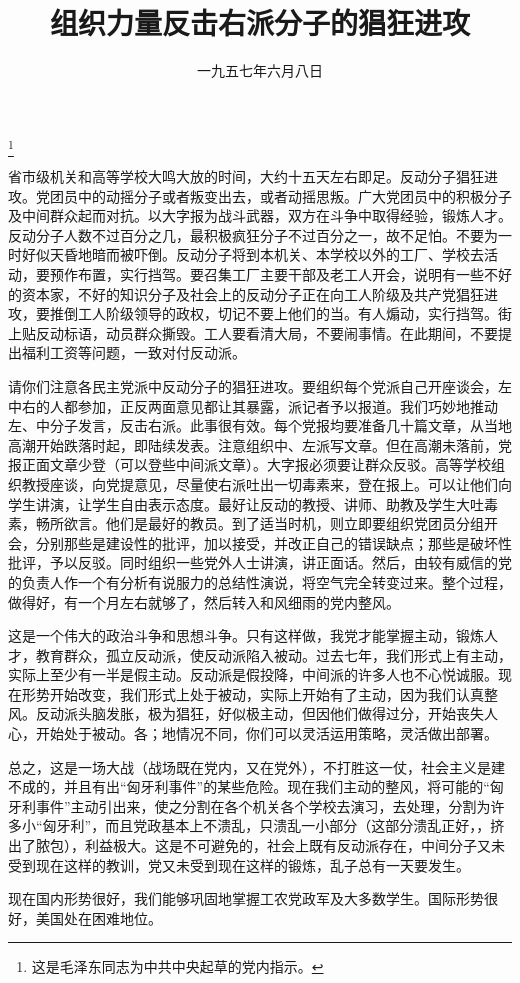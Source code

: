 
\title{组织力量反击右派分子的猖狂进攻}
\date{一九五七年六月八日}
\thanks{这是毛泽东同志为中共中央起草的党内指示。}
\maketitle


省市级机关和高等学校大鸣大放的时间，大约十五天左右即足。反动分子猖狂进攻。党团员中的动摇分子或者叛变出去，或者动摇思叛。广大党团员中的积极分子及中间群众起而对抗。以大字报为战斗武器，双方在斗争中取得经验，锻炼人才。反动分子人数不过百分之几，最积极疯狂分子不过百分之一，故不足怕。不要为一时好似天昏地暗而被吓倒。反动分子将到本机关、本学校以外的工厂、学校去活动，要预作布置，实行挡驾。要召集工厂主要干部及老工人开会，说明有一些不好的资本家，不好的知识分子及社会上的反动分子正在向工人阶级及共产党猖狂进攻，要推倒工人阶级领导的政权，切记不要上他们的当。有人煽动，实行挡驾。街上贴反动标语，动员群众撕毁。工人要看清大局，不要闹事情。在此期间，不要提出福利工资等问题，一致对付反动派。

请你们注意各民主党派中反动分子的猖狂进攻。要组织每个党派自己开座谈会，左中右的人都参加，正反两面意见都让其暴露，派记者予以报道。我们巧妙地推动左、中分子发言，反击右派。此事很有效。每个党报均要准备几十篇文章，从当地高潮开始跌落时起，即陆续发表。注意组织中、左派写文章。但在高潮未落前，党报正面文章少登（可以登些中间派文章）。大字报必须要让群众反驳。高等学校组织教授座谈，向党提意见，尽量使右派吐出一切毒素来，登在报上。可以让他们向学生讲演，让学生自由表示态度。最好让反动的教授、讲师、助教及学生大吐毒素，畅所欲言。他们是最好的教员。到了适当时机，则立即要组织党团员分组开会，分别那些是建设性的批评，加以接受，并改正自己的错误缺点；那些是破坏性批评，予以反驳。同时组织一些党外人士讲演，讲正面话。然后，由较有威信的党的负责人作一个有分析有说服力的总结性演说，将空气完全转变过来。整个过程，做得好，有一个月左右就够了，然后转入和风细雨的党内整风。

这是一个伟大的政治斗争和思想斗争。只有这样做，我党才能掌握主动，锻炼人才，教育群众，孤立反动派，使反动派陷入被动。过去七年，我们形式上有主动，实际上至少有一半是假主动。反动派是假投降，中间派的许多人也不心悦诚服。现在形势开始改变，我们形式上处于被动，实际上开始有了主动，因为我们认真整风。反动派头脑发胀，极为猖狂，好似极主动，但因他们做得过分，开始丧失人心，开始处于被动。各；地情况不同，你们可以灵活运用策略，灵活做出部署。

总之，这是一场大战（战场既在党内，又在党外），不打胜这一仗，社会主义是建不成的，并且有出“匈牙利事件”的某些危险。现在我们主动的整风，将可能的“匈牙利事件”主动引出来，使之分割在各个机关各个学校去演习，去处理，分割为许多小“匈牙利”，而且党政基本上不溃乱，只溃乱一小部分（这部分溃乱正好，，挤出了脓包），利益极大。这是不可避免的，社会上既有反动派存在，中间分子又未受到现在这样的教训，党又未受到现在这样的锻炼，乱子总有一天要发生。

现在国内形势很好，我们能够巩固地掌握工农党政军及大多数学生。国际形势很好，美国处在困难地位。
